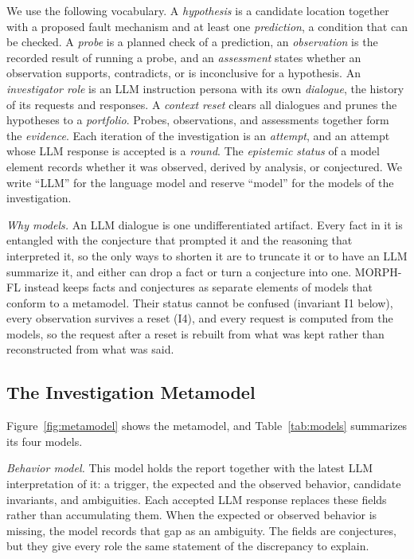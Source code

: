 \documentclass[letterpaper,journal]{IEEEtran}
\newcommand{\tool}{MORPH-FL}
\begin{document}
We use the following vocabulary. A \emph{hypothesis} is a candidate location together with a proposed fault mechanism and at least one \emph{prediction}, a condition that can be checked. A \emph{probe} is a planned check of a prediction, an \emph{observation} is the recorded result of running a probe, and an \emph{assessment} states whether an observation supports, contradicts, or is inconclusive for a hypothesis. An \emph{investigator role} is an LLM instruction persona with its own \emph{dialogue}, the history of its requests and responses. A \emph{context reset} clears all dialogues and prunes the hypotheses to a \emph{portfolio}. Probes, observations, and assessments together form the \emph{evidence}. Each iteration of the investigation is an \emph{attempt}, and an attempt whose LLM response is accepted is a \emph{round}. The \emph{epistemic status} of a model element records whether it was observed, derived by analysis, or conjectured. We write ``LLM'' for the language model and reserve ``model'' for the models of the investigation.

\emph{Why models.} An LLM dialogue is one undifferentiated artifact. Every fact in it is entangled with the conjecture that prompted it and the reasoning that interpreted it, so the only ways to shorten it are to truncate it or to have an LLM summarize it, and either can drop a fact or turn a conjecture into one. \tool{} instead keeps facts and conjectures as separate elements of models that conform to a metamodel. Their status cannot be confused (invariant I1 below), every observation survives a reset (I4), and every request is computed from the models, so the request after a reset is rebuilt from what was kept rather than reconstructed from what was said.

\subsection{The Investigation Metamodel}\label{sec:metamodel}
Figure~\ref{fig:metamodel} shows the metamodel, and Table~\ref{tab:models} summarizes its four models.

\emph{Behavior model.} This model holds the report together with the latest LLM interpretation of it: a trigger, the expected and the observed behavior, candidate invariants, and ambiguities. Each accepted LLM response replaces these fields rather than accumulating them. When the expected or observed behavior is missing, the model records that gap as an ambiguity. The fields are conjectures, but they give every role the same statement of the discrepancy to explain.
\end{document}
